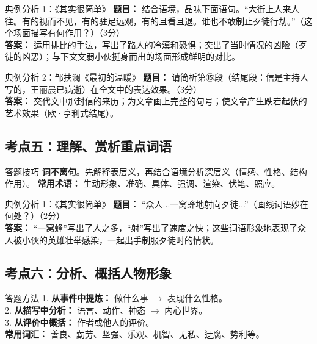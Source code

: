 \documentclass[11pt, a4paper]{ctexart}
\begin{document}
\begin{examplebox}{典例分析 1：《其实很简单》}
\textbf{题目：} 结合语境，品味下面语句。“大街上人来人往。有的视而不见，有的驻足远观，有的且看且退。谁也不敢制止歹徒行劫。”（这个场面描写有何作用？）（3分）\\
\textbf{答案：} 运用排比的手法，写出了路人的冷漠和恐惧；突出了当时情况的凶险（歹徒的凶恶）；与下文文弱小伙挺身而出的场面形成鲜明的对比。
\end{examplebox}

\begin{examplebox}{典例分析 2：邹扶澜《最初的温暖》}
\textbf{题目：} 请简析第⑮段（结尾段：信是主持人写的，王丽晨已病逝）在全文中的表达效果。（3分）\\
\textbf{答案：} 交代文中那封信的来历；为文章画上完整的句号；使文章产生跌宕起伏的艺术效果（欧·亨利式结尾）。
\end{examplebox}

\subsection{考点五：理解、赏析重点词语}

\begin{tipsbox}{答题技巧}
\textbf{词不离句}。先解释表层义，再结合语境分析深层义（情感、性格、结构作用）。
\textbf{常用术语：} 生动形象、准确、具体、强调、渲染、伏笔、照应。
\end{tipsbox}

\begin{examplebox}{典例分析 1：《其实很简单》}
\textbf{题目：} “众人...一窝蜂地射向歹徒...”（画线词语妙在何处？）（2分）\\
\textbf{答案：} “一窝蜂”写出了人之多，“射”写出了速度之快；这些词语形象地表现了众人被小伙的英雄壮举感染，一起出手制服歹徒时的情状。
\end{examplebox}

\subsection{考点六：分析、概括人物形象}

\begin{tipsbox}{答题方法}
1. \textbf{从事件中提炼：} 做什么事 $\to$ 表现什么性格。\\
2. \textbf{从描写中分析：} 语言、动作、神态 $\to$ 内心世界。\\
3. \textbf{从评价中概括：} 作者或他人的评价。\\
\textbf{常用词汇：} 善良、勤劳、坚强、乐观、机智、无私、迂腐、势利等。
\end{tipsbox}
\end{document}
